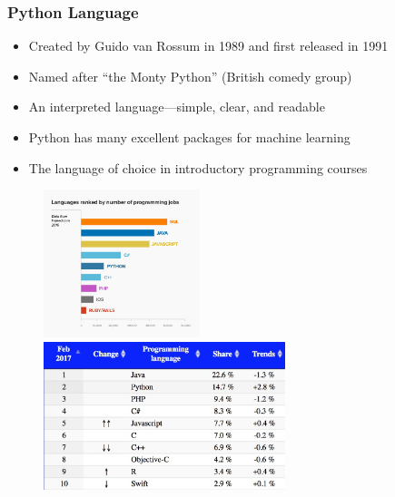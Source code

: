 \begin{frame}
  \MyLogo
  \frametitle{Python Language}  

\small 

\begin{itemize}

\item Created by Guido van Rossum in 1989 and first released in 1991

\item Named after ``the Monty Python'' (British comedy group)

\item An interpreted language---simple, clear, and readable 

\item Python has many excellent packages for machine learning

\item The language of choice in introductory programming courses

\end{itemize}

\begin{figure}[htbp] %
   \includegraphics[height=1.7in]{figures/ComputerLanguagesDemand.jpg} 
   \includegraphics[height=1.7in]{figures/ComputerLanguagesShare.jpg} 
\end{figure}

\end{frame}


